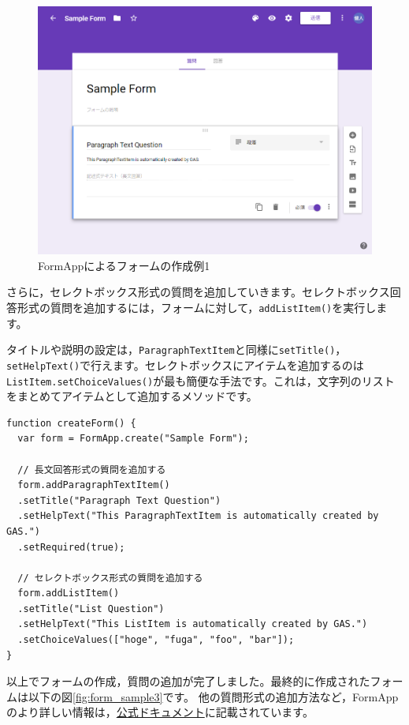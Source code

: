 \documentclass[uplatex,a4j]{jsarticle}
\begin{document}
\begin{figure}[H]
 \centering
 \includegraphics[keepaspectratio, scale=0.5]{images/form_sample1.png}
 \caption{FormAppによるフォームの作成例1}
 \label{fig:form_sample1}
\end{figure}

さらに，セレクトボックス形式の質問を追加していきます。セレクトボックス回答形式の質問を追加するには，フォームに対して，\verb|addListItem()|を実行します。


タイトルや説明の設定は，\verb|ParagraphTextItem|と同様に\verb|setTitle()|，\verb|setHelpText()|で行えます。セレクトボックスにアイテムを追加するのは\verb|ListItem.setChoiceValues()|が最も簡便な手法です。これは，文字列のリストをまとめてアイテムとして追加するメソッドです。

\begin{lstlisting}[basicstyle=\ttfamily\footnotesize,frame=single,caption=FormApp sample 5]
function createForm() {
  var form = FormApp.create("Sample Form");
  
  // 長文回答形式の質問を追加する
  form.addParagraphTextItem()
  .setTitle("Paragraph Text Question")
  .setHelpText("This ParagraphTextItem is automatically created by GAS.")
  .setRequired(true);
  
  // セレクトボックス形式の質問を追加する
  form.addListItem()
  .setTitle("List Question")
  .setHelpText("This ListItem is automatically created by GAS.")
  .setChoiceValues(["hoge", "fuga", "foo", "bar"]);
}
\end{lstlisting}

以上でフォームの作成，質問の追加が完了しました。最終的に作成されたフォームは以下の図\ref{fig:form_sample3}です。
他の質問形式の追加方法など，FormAppのより詳しい情報は，\href{https://developers.google.com/apps-script/reference/forms}{公式ドキュメント}に記載されています。
\end{document}

